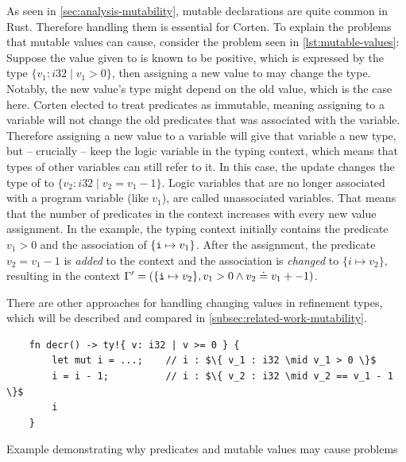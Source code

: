 \documentclass[twoside, english]{sdqthesis}
\theoremstyle{definition}
\begin{document}
As seen in \cref{sec:analysis-mutability}, mutable declarations are quite common in Rust. Therefore handling them is essential for Corten.
To explain the problems that mutable values can cause, consider the problem seen in \cref{lst:mutable-values}: Suppose the value given to  is known to be positive, which is expressed by the type $\{ v_1 : i32 \mid v_1 > 0\}$, then assigning a new value to  may change the type. Notably, the new value's type might depend on the old value, which is the case here.
Corten elected to treat predicates as immutable, meaning assigning to a variable will not change the old predicates that was associated with the variable.
Therefore assigning a new value to a variable will give that variable a new type, but -- crucially -- keep the logic variable in the typing context, which means that types of other variables can still refer to it. In this case, the update  changes the type of  to $\{ v_2 : i32 \mid v_2 = v_1 - 1\}$.
Logic variables that are no longer associated with a program variable (like $v_1$), are called unassociated variables.
That means that the number of predicates in the context increases with every new value assignment.
In the example, the typing context initially contains the predicate $v_1 > 0$ and the association of $\{\code{i} \mapsto v_1\}$. After the assignment, the predicate $v_2 = v_1 - 1$ is \textit{added} to the context and the association is \textit{changed} to $\{i \mapsto v_2\}$, resulting in the context $\Gamma' = (\{\code{i} \mapsto v_2\}, v_1 > 0 \wedge v_2 \doteq v_1 +-1)$.

There are other approaches for handling changing values in refinement types, which will be described and compared in \ref{subsec:related-work-mutability}.


\begin{listing}[ht]
  \begin{verbatim}
    fn decr() -> ty!{ v: i32 | v >= 0 } {
        let mut i = ...;    // i : $\{ v_1 : i32 \mid v_1 > 0 \}$
        i = i - 1;          // i : $\{ v_2 : i32 \mid v_2 == v_1 - 1 \}$
        i
    }
  \end{verbatim}
  \caption{Example demonstrating why predicates and mutable values may cause problems}
  \label{lst:mutable-values}
\end{listing}
\end{document}
